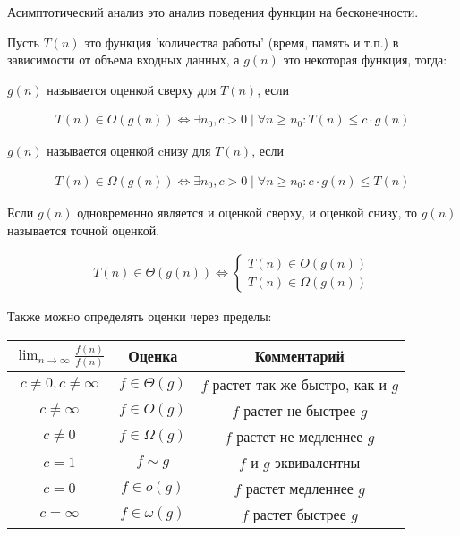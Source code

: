 
Асимптотический анализ это анализ поведения функции на бесконечности.

Пусть \(T(n)\) это функция 'количества работы' (время, память и т.п.) в
зависимости от объема входных данных, а \(g(n)\) это некоторая функция, тогда:

\begin{definition}
  \(g(n)\) называется оценкой сверху для \(T(n)\), если

  \begin{align*}
    T(n) \in O(g(n)) \iff
      \exists n_{0}, c > 0 \mid \forall n \ge n_{0} \colon T(n) \le c \cdot g(n)
  \end{align*}
\end{definition}

\begin{definition}
  \(g(n)\) называется оценкой cнизу для \(T(n)\), если
  
  \begin{align*}
    T(n) \in \Omega(g(n)) \iff
      \exists n_{0}, c > 0 \mid \forall n \ge n_{0} \colon c \cdot g(n) \le T(n)
  \end{align*}
\end{definition}

\begin{definition}
  Если \(g(n)\) одновременно является и оценкой сверху, и оценкой снизу, то
  \(g(n)\) называется точной оценкой.

  \begin{align*}
    T(n) \in \Theta(g(n)) \iff \begin{cases}
      T(n) \in O(g(n)) \\
      T(n) \in \Omega(g(n))
    \end{cases}
  \end{align*}
\end{definition}

Также можно определять оценки через пределы:

\begin{table}[H]
  \centering

  \renewcommand{\arraystretch}{1.5}
  \begin{tabular}{c|c|c}
    \(\lim_{n \to \infty} \frac{f(n)}{f(n)}\) & Оценка & Комментарий
    \\ \hline 
    \(c \neq 0, c \neq \infty\)
      & \(f \in \Theta(g)\)
      & \(f\) растет так же быстро, как и \(g\)
    \\
    \(c \neq \infty\)
      & \(f \in O(g)\)
      & \(f\) растет не быстрее \(g\)
    \\
      \(c \neq 0\)
        & \(f \in \Omega(g)\)
        & \(f\) растет не медленнее \(g\)
    \\
      \(c = 1\)
        & \(f \sim g\)
        & \(f\) и \(g\) эквивалентны
    \\
      \(c = 0\)
        & \(f \in o(g)\)
        & \(f\) растет медленнее \(g\)
    \\
      \(c = \infty\)
        & \(f \in \omega(g)\)
        & \(f\) растет быстрее \(g\)
  \end{tabular}
\end{table}

